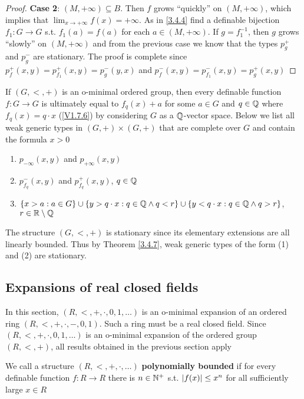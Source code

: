 \documentclass[11pt]{article}
\begin{document}
\begin{proof}
\textbf{Case 2}: \((M,+\infty)\subseteq B\).  Then \(f\) grows ``quickly'' on \((M,+\infty)\), which implies
that \(\lim_{x\to+\infty}f(x)=+\infty\). As in \ref{3.4.4} find a definable bijection \(f_1:G\to G\)
s.t. \(f_1(a)=f(a)\) for each \(a\in(M,+\infty)\). If \(g=f_1^{-1}\), then \(g\) grows ``slowly''
on \((M,+\infty)\) and from the previous case we know that the types \(p_g^+\) and \(p_g^-\) are
stationary. The proof is complete since
\(p_f^+(x,y)=p_{f_1}^+(x,y)=p_g^-(y,x)\) and \(p_f^-(x,y)=p_{f_1}^-(x,y)=p_g^+(x,y)\)
\end{proof}

\begin{corollary}
\label{V1.7.6}
\end{corollary}

\begin{examplle}[]
If \((G,<,+)\) is an o-minimal ordered group, then every definable function \(f:G\to G\) is
ultimately equal to \(f_q(x)+a\) for some \(a\in G\) and \(q\in\mathbb{Q}\) where \(f_q(x)=q\cdot x\)
(\ref{V1.7.6}) by considering \(G\) as a \(\mathbb{Q}\)-vector space. Below we list
all weak generic types in \((G,+)\times(G,+)\)
that are complete over \(G\) and contain the formula \(x>0\)
\begin{enumerate}
\item \(p_{-\infty}(x,y)\) and \(p_{+\infty}(x,y)\)
\item \(p_{f_q}^-(x,y)\) and \(p_{f_q}^+(x,y)\), \(q\in\mathbb{Q}\)
\item \(\{x>a:a\in G\}\cup\{y>q\cdot x:q\in\mathbb{Q}\wedge q<r\}\cup\{y<q\cdot x:q\in\mathbb{Q}\wedge q>r\}\), \(r\in\mathbb{R}\setminus\mathbb{Q}\)
\end{enumerate}
The structure \((G,<,+)\) is stationary since its elementary extensions are all linearly
bounded. Thus by Theorem \ref{3.4.7}, weak generic types of the form (1) and (2) are stationary.
\label{Problem7}
\end{examplle}

\subsection{Expansions of real closed fields}
\label{sec:org7a0a3b7}
In this section, \((R,<,+,\cdot,0,1,\dots)\) is an o-minimal expansion of an ordered
ring \((R,<,+,\cdot,-,0,1)\). Such a ring must be a real closed field. Since \((R,<,+,\cdot,0,1,\dots)\) is an
o-minimal expansion of the ordered group \((R,<,+)\), all results obtained in the previous
section apply

\begin{definition}[]
We call a structure \((R,<,+,\cdot,\dots)\) \textbf{polynomially bounded} if for every definable
function \(f:R\to R\) there is \(n\in\mathbb{N}^+\) s.t. \(\abs{f(x)}\le x^n\) for all sufficiently large \(x\in R\)
\end{definition}
\end{document}
